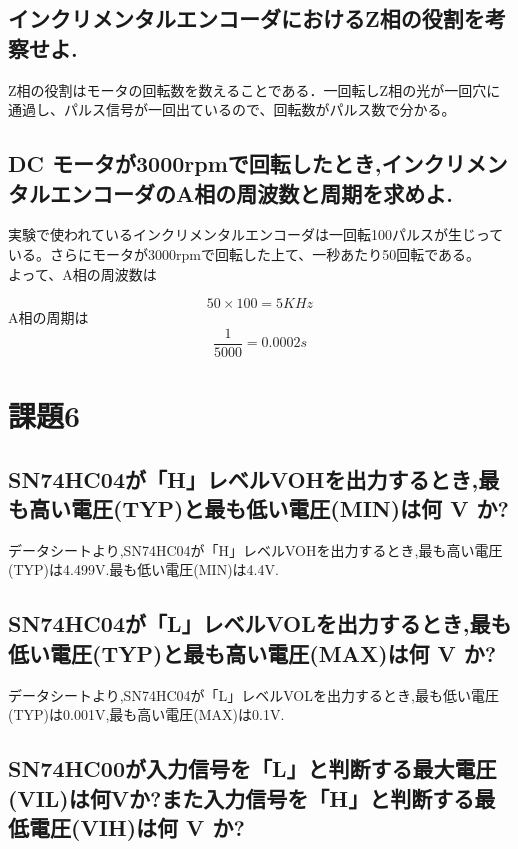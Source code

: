 \documentclass[xelatex,ja=standard,jafont=noto]{bxjsarticle}
\begin{document}
\subsection{インクリメンタルエンコーダにおけるZ相の役割を考察せよ.}
Z相の役割はモータの回転数を数えることである．一回転しZ相の光が一回穴に通過し、パルス信号が一回出ているので、回転数がパルス数で分かる。
\subsection{DC モータが3000rpmで回転したとき,インクリメンタルエンコーダのA相の周波数と周期を求めよ.}
実験で使われているインクリメンタルエンコーダは一回転100パルスが生じっている。さらにモータが3000rpmで回転した上て、一秒あたり50回転である。\\
よって、A相の周波数は

\begin{equation}
	50\times 100=5K{Hz}
\end{equation}
A相の周期は
\begin{equation}
	\frac{1}{5000}=0.0002{s}
\end{equation}





\iffalse
ここでコメント
\fi







\section{課題6}
\subsection{SN74HC04が「H」レベルVOHを出力するとき,最も高い電圧(TYP)と最も低い電圧(MIN)は何 V か?}
データシートより,SN74HC04が「H」レベルVOHを出力するとき,最も高い電圧(TYP)は4.499V.最も低い電圧(MIN)は4.4V.

\subsection{SN74HC04が「L」レベルVOLを出力するとき,最も低い電圧(TYP)と最も高い電圧(MAX)は何 V か?}
データシートより,SN74HC04が「L」レベルVOLを出力するとき,最も低い電圧(TYP)は0.001V,最も高い電圧(MAX)は0.1V.

\subsection{SN74HC00が入力信号を「L」と判断する最大電圧(VIL)は何Vか?また入力信号を「H」と判断する最低電圧(VIH)は何 V か?}
\end{document}
